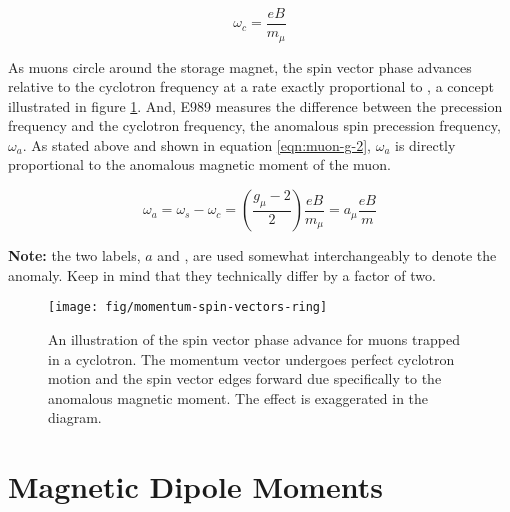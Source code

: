 \begin{equation}
\label{eqn:omega-c}
\omega_c = \frac{e B}{m_\mu}
\end{equation}

\noindent
As muons circle around the storage magnet, the spin vector phase advances relative to the cyclotron frequency at a rate exactly proportional to \gmtwo, a concept illustrated in figure \ref{fig:momentum-spin-vectors-ring}.  And, E989 measures the difference between the precession frequency and the cyclotron frequency, the anomalous spin precession frequency, $\omega_a$.  As stated above and shown in equation \ref{eqn:muon-g-2}, $\omega_a$ is directly proportional to the anomalous magnetic moment of the muon.

\begin{equation}
\label{eqn:muon-g-2}
\omega_a = \omega_s - \omega_c = \left( \frac{g_\mu - 2}{2} \right) \frac{e B}{m_\mu} = a_\mu \frac{e B}{m}
\end{equation}

\noindent
\textbf{Note:} the two labels, $a$ and \gmtwo, are used somewhat interchangeably to denote the anomaly.  Keep in mind that they technically differ by a factor of two.

\begin{figure}
\centering
\texttt{[image: fig/momentum-spin-vectors-ring]}
\caption{
    An illustration of the spin vector phase advance for muons trapped in a cyclotron.  The momentum vector undergoes perfect cyclotron motion and the spin vector edges forward due specifically to the anomalous magnetic moment.  The effect is exaggerated in the diagram. 
    \label{fig:momentum-spin-vectors-ring}
}
\end{figure}


\section{Magnetic Dipole Moments}

